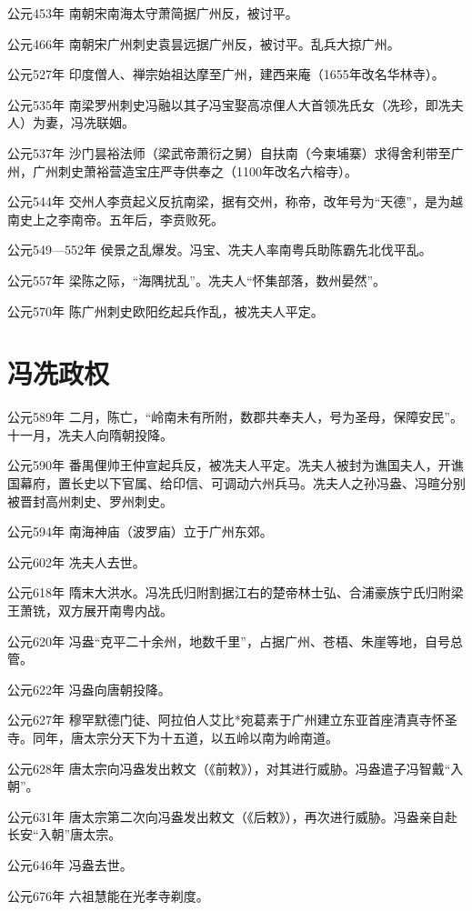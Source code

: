 公元453年 南朝宋南海太守萧简据广州反，被讨平。

公元466年 南朝宋广州刺史袁昙远据广州反，被讨平。乱兵大掠广州。

公元527年 印度僧人、禅宗始祖达摩至广州，建西来庵（1655年改名华林寺）。

公元535年 南梁罗州刺史冯融以其子冯宝娶高凉俚人大首领冼氏女（冼珍，即冼夫人）为妻，冯冼联姻。

公元537年 沙门昙裕法师（梁武帝萧衍之舅）自扶南（今柬埔寨）求得舍利带至广州，广州刺史萧裕营造宝庄严寺供奉之（1100年改名六榕寺）。

公元544年 交州人李贲起义反抗南梁，据有交州，称帝，改年号为“天德”，是为越南史上之李南帝。五年后，李贲败死。

公元549—552年 侯景之乱爆发。冯宝、冼夫人率南粤兵助陈霸先北伐平乱。

公元557年 梁陈之际，“海隅扰乱”。冼夫人“怀集部落，数州晏然”。

公元570年 陈广州刺史欧阳纥起兵作乱，被冼夫人平定。

\section*{冯冼政权}


公元589年 二月，陈亡，“岭南未有所附，数郡共奉夫人，号为圣母，保障安民”。十一月，冼夫人向隋朝投降。

公元590年 番禺俚帅王仲宣起兵反，被冼夫人平定。冼夫人被封为谯国夫人，开谯国幕府，置长史以下官属、给印信、可调动六州兵马。冼夫人之孙冯盎、冯暄分别被晋封高州刺史、罗州刺史。

公元594年 南海神庙（波罗庙）立于广州东郊。

公元602年 冼夫人去世。

公元618年 隋末大洪水。冯冼氏归附割据江右的楚帝林士弘、合浦豪族宁氏归附梁王萧铣，双方展开南粤内战。

公元620年 冯盎“克平二十余州，地数千里”，占据广州、苍梧、朱崖等地，自号总管。

公元622年 冯盎向唐朝投降。

公元627年 穆罕默德门徒、阿拉伯人艾比*宛葛素于广州建立东亚首座清真寺怀圣寺。同年，唐太宗分天下为十五道，以五岭以南为岭南道。

公元628年 唐太宗向冯盎发出敕文（《前敕》），对其进行威胁。冯盎遣子冯智戴“入朝”。

公元631年 唐太宗第二次向冯盎发出敕文（《后敕》），再次进行威胁。冯盎亲自赴长安“入朝”唐太宗。

公元646年 冯盎去世。

公元676年 六祖慧能在光孝寺剃度。

